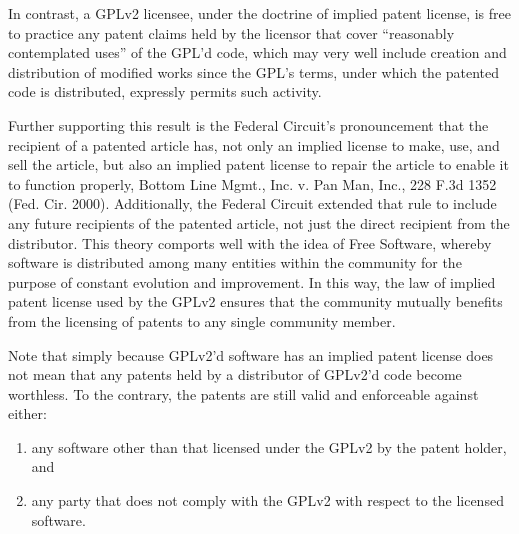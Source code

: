 In contrast, a GPLv2 licensee, under the doctrine of implied patent license, 
is free to practice any patent claims held by the licensor that cover 
``reasonably contemplated uses'' of the GPL'd code, which may very well 
include creation and distribution of modified works since the GPL's terms, 
under which the patented code is distributed, expressly permits such activity.


Further supporting this result is the Federal Circuit's pronouncement that
the recipient of a patented article has, not only an implied license to
make, use, and sell the article, but also an implied patent license to
repair the article to enable it to function properly, Bottom Line Mgmt.,
Inc. v. Pan Man, Inc., 228 F.3d 1352 (Fed. Cir. 2000). Additionally, the
Federal Circuit extended that rule to include any future recipients of the
patented article, not just the direct recipient from the distributor.
This theory comports well with the idea of Free Software, whereby software
is distributed among many entities within the community for the purpose
of constant evolution and improvement. In this way, the law of implied
patent license used by the GPLv2 ensures that the community mutually
benefits from the licensing of patents to any single community member.

Note that simply because GPLv2'd software has an implied patent license does
not mean that any patents held by a distributor of GPLv2'd code become
worthless. To the contrary, the patents are still valid and enforceable
against either:

\begin{enumerate}
 \renewcommand{\theenumi}{\alph{enumi}}
 \renewcommand{\labelenumi}{\textup{(\theenumi)}}

\item any software other than that licensed under the GPLv2 by the patent
  holder, and

\item any party that does not comply with the GPLv2
with respect to the licensed software.
\end{enumerate}

\newcommand{\compB}{$\mathcal{B}$}
\newcommand{\compA}{$\mathcal{A}$}

